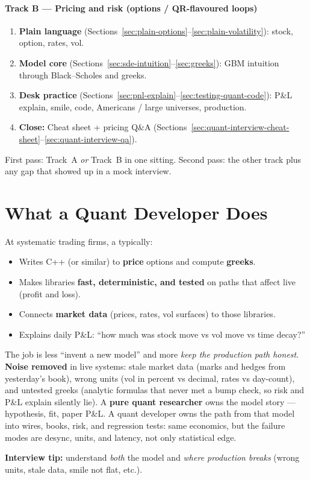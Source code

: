 \paragraph*{Track B --- Pricing and risk (options / QR-flavoured loops)}
\begin{enumerate}
    \item \textbf{Plain language} 
          (Sections~\ref{sec:plain-options}--\ref{sec:plain-volatility}): 
          stock, option, rates, vol.
    \item \textbf{Model core} 
          (Sections~\ref{sec:sde-intuition}--\ref{sec:greeks}): 
          GBM intuition through Black--Scholes and greeks.
    \item \textbf{Desk practice} 
          (Sections~\ref{sec:pnl-explain}--\ref{sec:testing-quant-code}): 
          P\&L explain, smile, code, Americans / large universes, production.
    \item \textbf{Close:} Cheat sheet + pricing Q\&A 
          (Sections~\ref{sec:quant-interview-cheat-sheet}--\ref{sec:quant-interview-qa}).
\end{enumerate}

\noindent First pass: Track~A \emph{or} Track~B in one sitting. Second pass: the other 
track plus any gap that showed up in a mock interview.

\section{What a Quant Developer Does}
\label{sec:quant-dev-role}
At systematic trading firms, a  typically:
\begin{itemize}
    \item Writes C++ (or similar) to \textbf{price} options and compute \textbf{greeks}.
    \item Makes libraries \textbf{fast, deterministic, and tested} on paths that affect 
          live  (profit and loss).
    \item Connects \textbf{market data} (prices, rates, vol surfaces) to those libraries.
    \item Explains daily P\&L: ``how much was stock move vs vol move vs time decay?''
\end{itemize}
The job is less ``invent a new model'' and more \emph{keep the production path honest}.
\newline
\textbf{Noise removed} in live systems: stale market data (marks and hedges from yesterday's 
book), wrong units (vol in percent vs decimal, rates vs day-count), and untested greeks 
(analytic formulas that never met a bump check, so risk and P\&L explain silently lie).
\newline
A \textbf{pure quant researcher} owns the model story --- hypothesis, fit, paper P\&L. 
A quant developer owns the path from that model into wires, books, risk, and regression 
tests: same economics, but the failure modes are desync, units, and latency, not only 
statistical edge.
\par\noindent\textbf{Interview tip:} understand \emph{both} the model and \emph{where production breaks} 
(wrong units, stale data, smile not flat, etc.).

